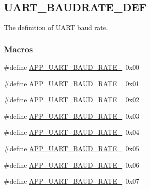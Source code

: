 \hypertarget{group___u_a_r_t___b_a_u_d_r_a_t_e___d_e_f}{}\subsection{U\+A\+R\+T\+\_\+\+B\+A\+U\+D\+R\+A\+T\+E\+\_\+\+D\+EF}
\label{group___u_a_r_t___b_a_u_d_r_a_t_e___d_e_f}


The definition of U\+A\+RT baud rate.  


\subsubsection*{Macros}
\begin{DoxyCompactItemize}
\item 
\#define \hyperlink{group___u_a_r_t___b_a_u_d_r_a_t_e___d_e_f_gaf3160677498bb32c3c909ba42252eace}{A\+P\+P\+\_\+\+U\+A\+R\+T\+\_\+\+B\+A\+U\+D\+\_\+\+R\+A\+T\+E\+\_}~0x00
\item 
\#define \hyperlink{group___u_a_r_t___b_a_u_d_r_a_t_e___d_e_f_ga69884bfc33bc69b8c7a65d865c342011}{A\+P\+P\+\_\+\+U\+A\+R\+T\+\_\+\+B\+A\+U\+D\+\_\+\+R\+A\+T\+E\+\_}~0x01
\item 
\#define \hyperlink{group___u_a_r_t___b_a_u_d_r_a_t_e___d_e_f_ga04e31727fc95254cde3c2f2d0133013e}{A\+P\+P\+\_\+\+U\+A\+R\+T\+\_\+\+B\+A\+U\+D\+\_\+\+R\+A\+T\+E\+\_}~0x02
\item 
\#define \hyperlink{group___u_a_r_t___b_a_u_d_r_a_t_e___d_e_f_gafdda9a2dd62555eefee4b21d7a87b478}{A\+P\+P\+\_\+\+U\+A\+R\+T\+\_\+\+B\+A\+U\+D\+\_\+\+R\+A\+T\+E\+\_}~0x03
\item 
\#define \hyperlink{group___u_a_r_t___b_a_u_d_r_a_t_e___d_e_f_ga2df4a0968d6a1c104e38ccc2bc3b614d}{A\+P\+P\+\_\+\+U\+A\+R\+T\+\_\+\+B\+A\+U\+D\+\_\+\+R\+A\+T\+E\+\_}~0x04
\item 
\#define \hyperlink{group___u_a_r_t___b_a_u_d_r_a_t_e___d_e_f_gabee3ba2ea1de3b8106834959cfe7dbbf}{A\+P\+P\+\_\+\+U\+A\+R\+T\+\_\+\+B\+A\+U\+D\+\_\+\+R\+A\+T\+E\+\_}~0x05
\item 
\#define \hyperlink{group___u_a_r_t___b_a_u_d_r_a_t_e___d_e_f_ga9ee90669f2f246bc551998b8af042ee5}{A\+P\+P\+\_\+\+U\+A\+R\+T\+\_\+\+B\+A\+U\+D\+\_\+\+R\+A\+T\+E\+\_}~0x06
\item 
\#define \hyperlink{group___u_a_r_t___b_a_u_d_r_a_t_e___d_e_f_ga49e58ace1a07d4079a388bae90172de3}{A\+P\+P\+\_\+\+U\+A\+R\+T\+\_\+\+B\+A\+U\+D\+\_\+\+R\+A\+T\+E\+\_}~0x07

\end{DoxyCompactItemize}
